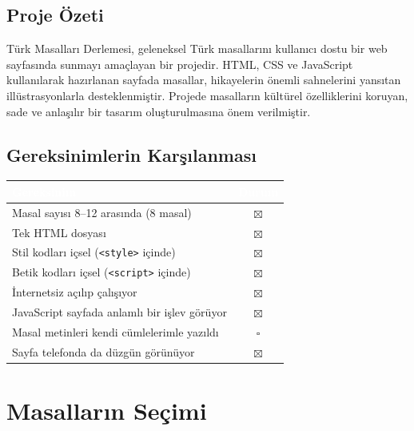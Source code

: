 \documentclass[12pt,a4paper]{article}
\begin{document}
\subsection{Proje Özeti}
Türk Masalları Derlemesi, geleneksel Türk masallarını kullanıcı dostu bir web sayfasında sunmayı amaçlayan bir projedir. HTML, CSS ve JavaScript kullanılarak hazırlanan sayfada masallar, hikayelerin önemli sahnelerini yansıtan illüstrasyonlarla desteklenmiştir. Projede masalların kültürel özelliklerini koruyan, sade ve anlaşılır bir tasarım oluşturulmasına önem verilmiştir.

\subsection{Gereksinimlerin Karşılanması}
\begin{center}
\begin{tabular}{@{}p{8.2cm}c@{}}
\toprule
\rowcolor{ana}\textcolor{white}{\textbf{Gereksinim}} & \textcolor{white}{\textbf{Durum}} \\
\midrule
Masal sayısı 8--12 arasında (8 masal)         &  $\boxtimes$ \\
Tek HTML dosyası                                    &  $\boxtimes$ \\
Stil kodları içsel (\texttt{<style>} içinde)        &  $\boxtimes$ \\
Betik kodları içsel (\texttt{<script>} içinde)      &  $\boxtimes$ \\
İnternetsiz açılıp çalışıyor                        &  $\boxtimes$ \\
JavaScript sayfada anlamlı bir işlev görüyor        &  $\boxtimes$\\
Masal metinleri kendi cümlelerimle yazıldı          & $\square$ \\
Sayfa telefonda da düzgün görünüyor                 & $\boxtimes$ \\
\bottomrule
\end{tabular}
\end{center}


\section{Masalların Seçimi}
\end{document}
